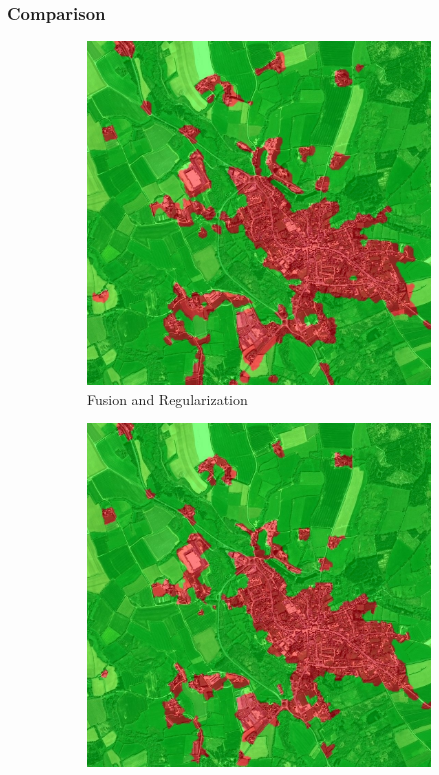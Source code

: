 \documentclass[10pt]{article}
\begin{document}
\subsubsection{Comparison}
\begin{figure}[H]
    \centering
    \begin{subfigure}{0.49\textwidth}
        \centering
        \includegraphics[width=\textwidth]{R2_T41000_30000_regul_proba_Fusion_Min_100_1000_100_0_100_70_100_200_0_0_0}
        \caption{Fusion and Regularization}
        \label{subfig:fusionRegComp}
    \end{subfigure}
    \begin{subfigure}{0.49\textwidth}
        \centering
        \includegraphics[width=\textwidth]{regul_seg_maj_3}

\end{subfigure}
\end{figure}
\end{document}
